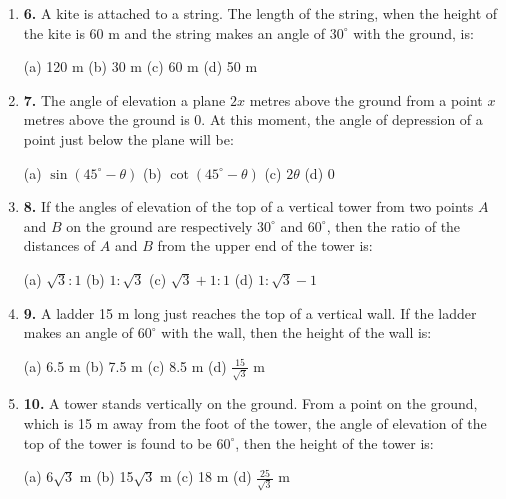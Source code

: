 \documentclass{article}
\begin{document}
\begin{enumerate}
	\item \textbf{6.} A kite is attached to a string. The length of the string, when the height of the kite is 60 m and the string makes an angle of $30^\circ$ with the ground, is:  
	
	
	(a) 120 m \quad (b) 30 m \quad (c) 60 m \quad (d) 50 m
	
	\vspace{0.3cm}
	
	\item \textbf{7.} The angle of elevation a plane $2x$ metres above the ground from a point $x$ metres above the ground is $0$. At this moment, the angle of depression of a point just below the plane will be:  
	
	
	(a) $\sin (45^\circ - \theta)$ \quad (b) $\cot (45^\circ - \theta)$ \quad (c) $2\theta$ \quad (d) $0$
	
	\vspace{0.3cm}
	
	\item \textbf{8.} If the angles of elevation of the top of a vertical tower from two points $A$ and $B$ on the ground are respectively $30^\circ$ and $60^\circ$, then the ratio of the distances of $A$ and $B$ from the upper end of the tower is:  
	
	
	(a) $\sqrt{3} : 1$ \quad (b) $1 : \sqrt{3}$ \quad (c) $\sqrt{3} + 1 : 1$ \quad (d) $1 : \sqrt{3} - 1$
	
	\vspace{0.3cm}
	
	\item \textbf{9.} A ladder 15 m long just reaches the top of a vertical wall. If the ladder makes an angle of $60^\circ$ with the wall, then the height of the wall is: 
	
	 
	(a) 6.5 m \quad (b) 7.5 m \quad (c) 8.5 m \quad (d) $\frac{15}{\sqrt{3}}$ m
	
	\vspace{0.3cm}
	
	\item \textbf{10.} A tower stands vertically on the ground. From a point on the ground, which is 15 m away from the foot of the tower, the angle of elevation of the top of the tower is found to be $60^\circ$, then the height of the tower is:  
	
	
	(a) 6$\sqrt{3}$ m \quad (b) 15$\sqrt{3}$ m \quad (c) 18 m \quad (d) $\frac{25}{\sqrt{3}}$ m
	
	\vspace{0.5cm}
	

\end{enumerate}
\end{document}
